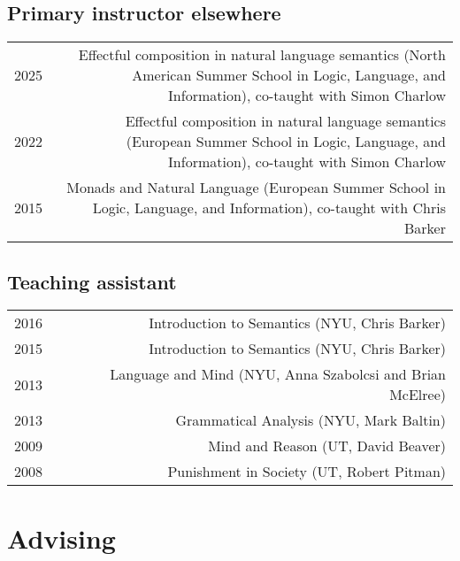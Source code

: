 \documentclass[12pt]{article}
\begin{document}
\subsection*{Primary instructor elsewhere}%

\begin{longtable}{LR}
  2025 & Effectful composition in natural language semantics (North American
         Summer School in Logic, Language, and Information), co-taught with
         Simon Charlow\\

  2022 & Effectful composition in natural language semantics (European Summer
         School in Logic, Language, and Information), co-taught with Simon
         Charlow\\
  2015 & Monads and Natural Language (European Summer School in Logic, Language,
         and Information), co-taught with Chris Barker
\end{longtable}

\subsection*{Teaching assistant}

\begin{longtable}{LR}
  2016 & Introduction to Semantics (NYU, Chris Barker)
         \\
  2015 & Introduction to Semantics (NYU, Chris Barker)
         \\
  2013 & Language and Mind (NYU, Anna Szabolcsi and Brian McElree)
         \\
  2013 & Grammatical Analysis (NYU, Mark Baltin)
         \\
  2009 & Mind and Reason (UT, David Beaver)
         \\
  2008 & Punishment in Society (UT, Robert Pitman)
\end{longtable}


\medskip

\section*{Advising}
\end{document}
